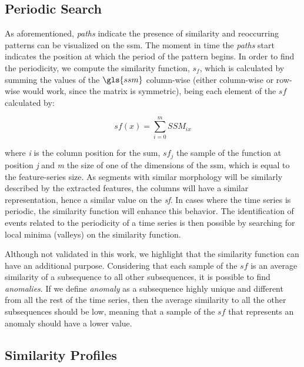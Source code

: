 \subsection{Periodic Search}

As aforementioned, \textit{paths} indicate the presence of similarity and reoccurring patterns can be visualized on the \gls{ssm}. The moment in time the \textit{paths} start indicates the position at which the period of the pattern begins. In order to find the periodicity, we compute the similarity function, $s_f$, which is calculated by summing the values of the $\gls{ssm}$ column-wise (either column-wise or row-wise would work, since the matrix is symmetric), being each element of the $sf$ calculated by:

\begin{equation}
sf(x) = \sum_{i=0}^{m}{SSM_{ix}}
\end{equation}

\noindent where \textit{i} is the column position for the sum, $sf_{j}$ the sample of the function at position \textit{j} and \textit{m} the size of one of the dimensions of the \gls{ssm}, which is equal to the feature-series size. As segments with similar morphology will be similarly described by the extracted features, the columns will have a similar representation, hence a similar value on the \textit{sf}. In cases where the time series is periodic, the similarity function will enhance this behavior. The identification of events related to the periodicity of a time series is then possible by searching for local minima (valleys) on the similarity function.
\par
Although not validated in this work, we highlight that the similarity function can have an additional purpose. Considering that each sample of the $sf$ is an average similarity of a subsequence to all other subsequences, it is possible to find \textit{anomalies}. If we define \textit{anomaly} as a subsequence highly unique and different from all the rest of the time series, then the average similarity to all the other subsequences should be low, meaning that a sample of the $sf$ that represents an anomaly should have a lower value. 

\subsection{Similarity Profiles}

